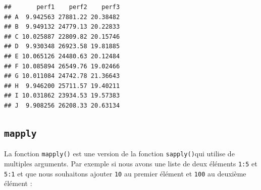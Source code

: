 \documentclass[
]{book}
\newenvironment{Shaded}{\begin{snugshade}}{\end{snugshade}}
\newcommand{\ControlFlowTok}[1]{\textcolor[rgb]{0.13,0.29,0.53}{\textbf{#1}}}
\newcommand{\DataTypeTok}[1]{\textcolor[rgb]{0.13,0.29,0.53}{#1}}
\newcommand{\DecValTok}[1]{\textcolor[rgb]{0.00,0.00,0.81}{#1}}
\newcommand{\KeywordTok}[1]{\textcolor[rgb]{0.13,0.29,0.53}{\textbf{#1}}}
\newcommand{\NormalTok}[1]{#1}
\newcommand{\OperatorTok}[1]{\textcolor[rgb]{0.81,0.36,0.00}{\textbf{#1}}}
\newcommand{\OtherTok}[1]{\textcolor[rgb]{0.56,0.35,0.01}{#1}}
\newcommand{\StringTok}[1]{\textcolor[rgb]{0.31,0.60,0.02}{#1}}
\begin{document}
\begin{Shaded}
\end{Shaded}

\begin{verbatim}
##       perf1    perf2    perf3
## A  9.942563 27881.22 20.38482
## B  9.949132 24779.13 20.22833
## C 10.025887 22809.82 20.15746
## D  9.930348 26923.58 19.81885
## E 10.065126 24480.63 20.12484
## F 10.085894 26549.76 19.02466
## G 10.011084 24742.78 21.36643
## H  9.946200 25711.57 19.40211
## I 10.031862 23934.53 19.57383
## J  9.908256 26208.33 20.63134
\end{verbatim}

\hypertarget{l17mapply}{%
\subsection{\texorpdfstring{\texttt{mapply}}{mapply}}\label{l17mapply}}

La fonction \texttt{mapply()} est une version de la fonction \texttt{sapply()}qui utilise de multiples arguments. Par exemple si nous avons une liste de deux éléments \texttt{1:5} et \texttt{5:1} et que nous souhaitons ajouter \texttt{10} au premier élément et \texttt{100} au deuxième élément :
\end{document}
